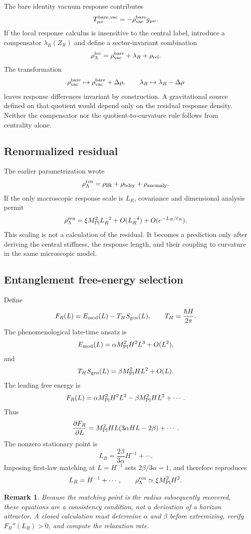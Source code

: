 \documentclass[11pt]{article}
\newtheorem{remark}[theorem]{Remark}
\begin{document}
The bare identity vacuum response contributes
\[
T_{\mu\nu}^{\rm bare,vac}=-\rho_{\rm vac}^{\rm bare}g_{\mu\nu}.
\]
If the local response calculus is insensitive to the central label,
introduce a compensator $\lambda_R(Z_R)$ and define a sector-invariant
combination
\[
\rho_\Lambda^{\rm loc}=\rho_{\rm vac}^{\rm bare}+\lambda_R+\rho_{\rm rel}.
\]
The transformation
\[
\rho_{\rm vac}^{\rm bare}\mapsto \rho_{\rm vac}^{\rm bare}+\Delta\rho,
\qquad
\lambda_R\mapsto\lambda_R-\Delta\rho
\]
leaves response differences invariant by construction.  A gravitational
source defined on that quotient would depend only on the residual response
density.  Neither the compensator nor the quotient-to-curvature rule follows
from centrality alone.

\subsection*{Renormalized residual}

The earlier parametrization wrote
\[
\rho_\Lambda^{\rm ren}=\rho_{\rm IR}+\rho_{\rm bdry}+\rho_{\rm anomaly}.
\]
If the only macroscopic response scale is $L_R$, covariance and dimensional
analysis permit
\[
\rho_\Lambda^{\rm ren}=\xi M_{\rm Pl}^2L_R^{-2}+O(L_R^{-4})+O(e^{-L_R/\ell_R}).
\]
This scaling is not a calculation of the residual.  It becomes a prediction
only after deriving the central stiffness, the response length, and their
coupling to curvature in the same microscopic model.

\subsection*{Entanglement free-energy selection}

Define
\[
F_R(L)=E_{\rm mod}(L)-T_HS_{\rm gen}(L),
\qquad T_H=\frac{\hbar H}{2\pi}.
\]
The phenomenological late-time ansatz is
\[
E_{\rm mod}(L)=\alpha M_{\rm Pl}^2H^2L^3+O(L^2),
\]
and
\[
T_HS_{\rm gen}(L)=\beta M_{\rm Pl}^2HL^2+O(L).
\]
The leading free energy is
\[
F_R(L)=\alpha M_{\rm Pl}^2H^2L^3-\beta M_{\rm Pl}^2HL^2+\cdots.
\]
Thus
\[
\frac{\partial F_R}{\partial L}=M_{\rm Pl}^2HL(3\alpha HL-2\beta)+\cdots.
\]
The nonzero stationary point is
\[
L_R=\frac{2\beta}{3\alpha}H^{-1}+\cdots.
\]
Imposing first-law matching at \(L=H^{-1}\) sets
\(2\beta/3\alpha=1\), and therefore reproduces
\[
L_R=H^{-1}+\cdots,
\qquad
\rho_\Lambda^{\rm ren}\simeq \xi M_{\rm Pl}^2H^2.
\]

\begin{remark}
Because the matching point is the radius subsequently recovered, these
equations are a consistency condition, not a derivation of a horizon
attractor.  A closed calculation must determine \(\alpha\) and \(\beta\)
before extremizing, verify \(F_R''(L_R)>0\), and compute the relaxation rate.
\end{remark}
\end{document}
